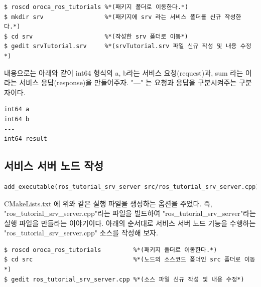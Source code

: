 \begin{lstlisting}[language=ROS]
$ roscd oroca_ros_tutorials %*(패키지 폴더로 이동한다.*)
$ mkdir srv                 %*(패키지에 srv 라는 서비스 폴더를 신규 작성한다.*)
$ cd srv                    %*(작성한 srv 폴더로 이동*)
$ gedit srvTutorial.srv     %*(srvTutorial.srv 파일 신규 작성 및 내용 수정*)
\end{lstlisting}

내용으로는 아래와 같이 int64 형식의 a, b라는 서비스 요청(request)과, sum 라는 이라는 서비스 응답(response)을 만들어주자. "---" 는 요청과 응답을 구분시켜주는 구분자이다.

\begin{lstlisting}[language=ROS]
int64 a
int64 b
---
int64 result
\end{lstlisting}

\subsection{서비스 서버 노드 작성}

\begin{lstlisting}[language=make]
add_executable(ros_tutorial_srv_server src/ros_tutorial_srv_server.cpp)
\end{lstlisting}

CMakeLists.txt 에 위와 같은 실행 파일을 생성하는 옵션을 주었다. 즉, "ros\_tutorial\_srv\_server.cpp"라는 파일을 빌드하여 "ros\_tutorial\_srv\_server"라는 실행 파일을 만들라는 이야기이다. 아래의 순서대로 서비스 서버 노드 기능을 수행하는 "ros\_tutorial\_srv\_server.cpp" 소스를 작성해 보자. 

\begin{lstlisting}[language=ROS]
$ roscd oroca_ros_tutorials         %*(패키지 폴더로 이동한다.*)
$ cd src                            %*(노드의 소스코드 폴더인 src 폴더로 이동*)
$ gedit ros_tutorial_srv_server.cpp %*(소스 파일 신규 작성 및 내용 수정*)
\end{lstlisting}

